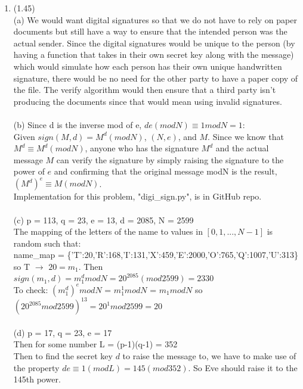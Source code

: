 \documentclass{article}
\begin{document}
\begin{enumerate}
		\item
			(1.45) 
			\\
			(a) We would want digital signatures so that we do not have to rely on paper documents but still have a way to ensure that the intended person was the actual sender. Since the digital signatures would be unique to the person (by having a function that takes in their own secret key along with the message) which would simulate how each person has their own unique handwritten signature, there would be no need for the other party to have a paper copy of the file. The verify algorithm would then ensure that a third party isn't producing the documents since that would mean using invalid signatures.
			\\ \\
			(b) Since d is the inverse mod of e, $de(mod N) \equiv 1 mod N = 1$: \\
        			Given $sign(M,d) = M^d(modN)$, $(N,e)$, and $M$. Since we know that $M^d \equiv M^d(modN)$, anyone who has the signature $M^d$ and the actual message $M$ can verify the signature by simply raising the signature to the power of $e$ and confirming that the original message modN is the result, $(M^{d})^{e} \equiv M(modN)$.
			\\
			Implementation for this problem, "digi\_sign.py", is in GitHub repo.
			\\
			\\
			(c) p = 113, q = 23, e = 13, d = 2085, N = 2599
			\\
			The mapping of the letters of the name to values in $[0,1,...,N-1]$ is random such that: \\
			name\_map = \{'T':20,'R':168,'I':131,'X':459,'E':2000,'O':765,'Q':1007,'U':313\} \\
			so T $\rightarrow$ $20 = m_1$. Then $sign(m_1,d) = m_1^dmodN = 20^{2085}(mod 2599) = 2330$ 	\\
			To check: $(m_1^d)^emodN$ = $m_1^1modN$ = $m_1modN$ so $(20^{2085}mod2599)^{13} = 20^1mod2599 = 20$
			\\ \\
			(d) p = 17, q = 23, e = 17 \\
			Then for some number L = (p-1)(q-1) = 352 \\
			Then to find the secret key $d$ to raise the message to, we have to make use of the property $de \equiv1(modL) = 145(mod352)$.
			So Eve should raise it to the 145th power.
			\\
			

\end{enumerate}
\end{document}
